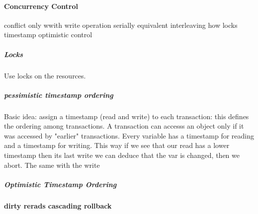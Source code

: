 \documentclass[11pt]{article}
\begin{document}
\paragraph{Concurrency Control} %
\label{par:concurrency_control}
conflict only wwith write operation
serially equivalent interleaving
how 
locks 
timestamp
optimistic control

\subparagraph{Locks} %
\label{subp:locks}
Use locks on the resources.
\subparagraph{pessimistic timestamp ordering}
\label{subp:pessimistic_timestamp_ordering}
Basic idea: assign a timestamp (read and write) to each transaction: this defines the ordering among transactions. A transaction can accesss an object only if it was accessed by "earlier" transactions.
Every variable has a timestamp for reading and a timestamp for writing. This way if we see that our read has a lower timestamp then its last write we can deduce that the var is changed, then we abort.
The same with the write

\subparagraph{Optimistic Timestamp Ordering} %
\label{subp:optimistic_timestamp_ordering}


\paragraph{dirty rerads cascading rollback} %
\label{par:dirty_rerads_cascading_rollback}

\end{document}
